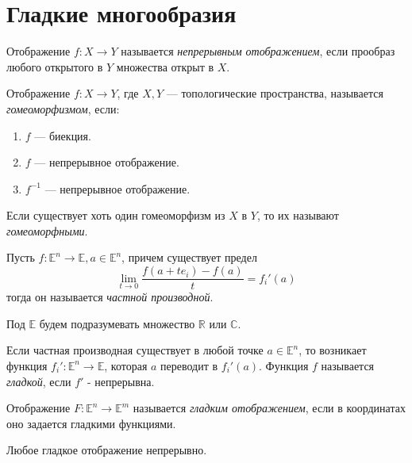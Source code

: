 \section{Гладкие многообразия}

\begin{defi}
Отображение $f:X\to Y$ называется \textit{непрерывным отображением}, если прообраз любого открытого в $Y$ множества открыт в $X$.
\end{defi}

\begin{defi}
Отображение $f:X\to Y$, где $X,Y$ — топологические пространства, называется \textit{гомеоморфизмом}, если:
\begin{enumerate}
  \item $f$ — биекция.
  \item $f$ — непрерывное отображение.
  \item $f^{-1}$ — непрерывное отображение.
\end{enumerate}
Если существует хоть один гомеоморфизм из $X$ в $Y$, то их называют \textit{гомеоморфными}.
\end{defi}

\begin{defi}
Пусть $f:\mathbb{E}^n\to\mathbb{E},a\in\mathbb{E}^n$, причем существует предел
$$\lim_{t\to 0}\frac{f(a+te_i)-f(a)}{t}=f_i'(a)$$
тогда он называется \textit{частной производной}.
\end{defi}

\begin{remark}
Под $\mathbb{E}$ будем подразумевать множество $\mathbb{R}$ или $\mathbb{C}$.
\end{remark}

\begin{defi}
Если частная производная существует в любой точке $a\in\mathbb{E}^n$, то возникает функция ${f_i':\mathbb{E}^n\to\mathbb{E}}$, которая $a$ переводит в $f_i'(a)$.
Функция $f$ называется \textit{гладкой}, если $f'$ - непрерывна.
\end{defi}

\begin{defi}
Отображение ${F:\mathbb{E}^n\to\mathbb{E}^m}$ называется \textit{гладким отображением}, если в координатах оно задается гладкими функциями.
\end{defi}

\begin{ass}
Любое гладкое отображение непрерывно.
\end{ass}

